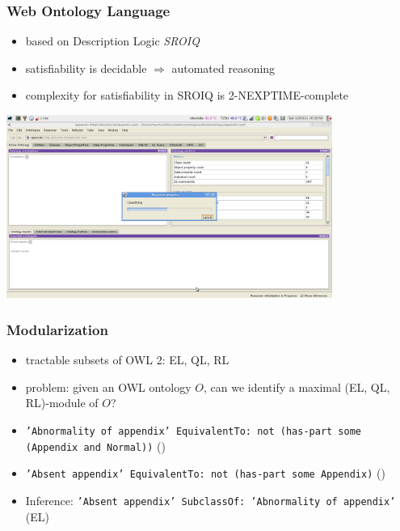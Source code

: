 \documentclass{beamer}
\renewcommand{\em}{\itshape}
\begin{document}
\begin{frame}
  \frametitle{Web Ontology Language}
  \begin{itemize}
  \item based on Description Logic {\em SROIQ}
  \item satisfiability is decidable $\Rightarrow$ automated reasoning
  \item complexity for satisfiability in SROIQ is 2-NEXPTIME-complete
  \end{itemize}
  \centerline{\includegraphics[width=0.8\textwidth]{classifying.png}}
\end{frame}

\begin{frame}
  \frametitle{Modularization}
  \begin{itemize}
  \item tractable subsets of OWL 2: EL, QL, RL
  \item problem: given an OWL ontology $O$, can we identify a maximal
    (EL, QL, RL)-module of $O$?
  \end{itemize}
  \pause
  \begin{itemize}
  \item {\tt 'Abnormality of appendix' EquivalentTo: not (has-part some (Appendix
    and Normal))} ({})
  \item {\tt 'Absent appendix' EquivalentTo: not (has-part some Appendix)} ({})
  \end{itemize}
  \pause
  \begin{itemize}
  \item Inference: {\tt 'Absent appendix' SubclassOf: 'Abnormality of
      appendix'} (EL)
  \end{itemize}
\end{frame}
\end{document}
